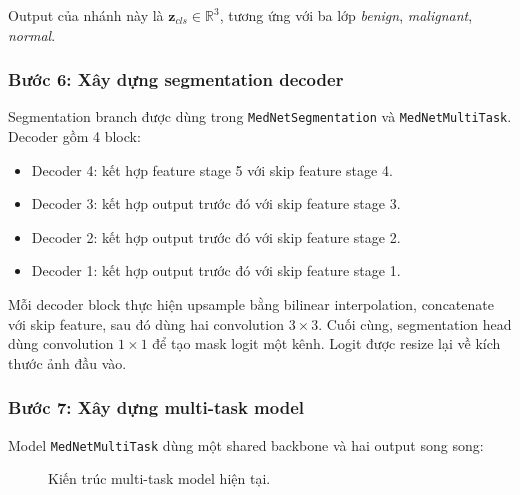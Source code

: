 \documentclass[12pt,a4paper]{article}
\begin{document}
Output của nhánh này là \( \mathbf{z}_{cls} \in \mathbb{R}^{3} \), tương ứng với ba lớp \textit{benign}, \textit{malignant}, \textit{normal}.

\subsubsection*{Bước 6: Xây dựng segmentation decoder}

Segmentation branch được dùng trong \texttt{MedNetSegmentation} và \texttt{MedNetMultiTask}. Decoder gồm 4 block:

\begin{itemize}
    \item Decoder 4: kết hợp feature stage 5 với skip feature stage 4.
    \item Decoder 3: kết hợp output trước đó với skip feature stage 3.
    \item Decoder 2: kết hợp output trước đó với skip feature stage 2.
    \item Decoder 1: kết hợp output trước đó với skip feature stage 1.
\end{itemize}

Mỗi decoder block thực hiện upsample bằng bilinear interpolation, concatenate với skip feature, sau đó dùng hai convolution \(3 \times 3\). Cuối cùng, segmentation head dùng convolution \(1 \times 1\) để tạo mask logit một kênh. Logit được resize lại về kích thước ảnh đầu vào.

\subsubsection*{Bước 7: Xây dựng multi-task model}

Model \texttt{MedNetMultiTask} dùng một shared backbone và hai output song song:

\begin{figure}[H]
\centering
{}
\caption{Kiến trúc multi-task model hiện tại.}
\end{figure}
\end{document}
